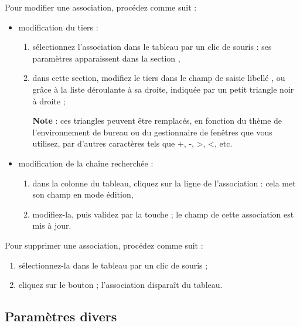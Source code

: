 Pour modifier une association, procédez comme suit :
\begin{itemize}
	\item modification du tiers :
		\begin{enumerate}
			\item sélectionnez l'association dans le tableau par un clic de souris : ses paramètres apparaissent dans la section ,
			\item dans cette section, modifiez le tiers dans le champ de saisie libellé , ou grâce à la liste déroulante à sa droite, indiquée par un petit triangle noir à droite ;	

			\textbf{Note} : ces triangles peuvent être remplacés, en fonction du thème de l'environnement de bureau ou du gestionnaire de fenêtres que vous utilisez, par d'autres caractères tels que +, -, >, <, etc.
		\end{enumerate}		
	\item modification de la chaîne recherchée :		
		\begin{enumerate}
			\item dans la colonne  du tableau, cliquez sur la ligne de l’association : cela met son champ  en mode édition,
			\item modifiez-la, puis validez par la touche  ; le champ  de cette association est mis à jour.	
		\end{enumerate}
\end{itemize} 
 
\ifIllustration
\fi 
 
Pour supprimer une association, procédez comme suit :
\begin{enumerate}
	\item sélectionnez-la dans le tableau par un clic de souris ;
	\item cliquez sur le bouton  ; l'association disparaît du tableau.
\end{enumerate}





\subsection{Paramètres divers\label{setup-general-various}}

